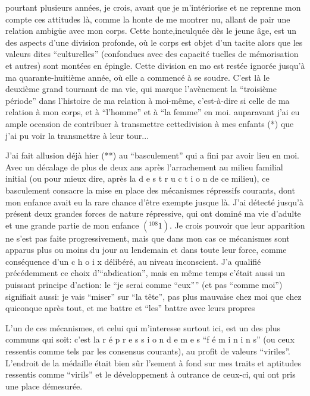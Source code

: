 
pourtant plusieurs années, je crois, avant que je m'intériorise et ne reprenne  mon compte ces attitudes là, comme la honte de me montrer nu, allant de pair  une relation ambigüe avec mon corps. Cette honte,inculquée dès le jeune âge, est un des aspects d'une division profonde, où le corps est objet d'un tacite  alors que les valeurs dites ``culturelles'' (confondues avec des capacité \newline tuelles de mémorisation et autres) sont montées en épingle. Cette division en mo est restée ignorée jusqu'à ma quarante-huitième année, où elle a commencé à se \inserted{-}\newline soudre. C'est là le deuxième grand tournant de ma vie, qui marque l'avènement  la ``troisième période'' dans l'histoire de ma relation à moi-même, c'est-à-dire \newline si celle de ma relation à mon corps, et à ``l'homme'' et à ``la femme'' en moi.  auparavant j'ai eu ample occasion de contribuer à transmettre cette\unsure{-| }division à mes enfants (*)\inserted{,} que j'ai pu voir la transmettre à leur tour...

J'ai fait allusion déjà hier (**) au ``basculement'' qui a fini par avoir lieu en moi. Avec un décalage de plus de deux ans après l'arrachement au milieu familial initial (ou pour mieux dire, après la d e s t r u c t i o n de ce milieu), ce basculement consacre la mise en place des mécanismes répressifs courants, dont mon enfance avait eu la rare chance d'être exempte jusque là. J'ai détecté jusqu'à présent deux grandes forces de nature répressive, qui ont dominé ma vie d'adulte et une grande partie de mon enfance $({}^{108}1)$. Je crois pouvoir  que leur apparition ne s'est pas faite progressivement, mais que dans mon cas ce mécanismes sont apparus plus ou moins du jour au lendemain et dans toute leur force, comme conséquence d'un c h o i x délibéré, au niveau inconscient. J'a qualifié précédemment ce choix d'``abdication'', mais en même temps c'était aussi un puissant principe d'action: le ``je serai comme ``eux'''' (et pas ``comme moi'') signifiait aussi: je vais ``miser'' sur ``la tête'', pas plus mauvaise chez moi que chez quiconque après tout, et me battre et ``les'' battre avec leurs propres 

L'un de ces mécanismes, et celui qui m'interesse surtout ici, est un des plus communs qui soit: c'est la r é p r e s s i o n d e m e s  ``f é m i n i n s'' (ou ceux ressentis comme tels par les consensus courants), au profit de valeurs ``viriles''. L'endroit de la médaille était bien sûr l'\newline sement à fond sur mes traits et aptitudes ressentis comme ``virils'' et le dévelop\inserted{-}\newline pement à outrance de ceux-ci, qui ont pris une place démesurée.

